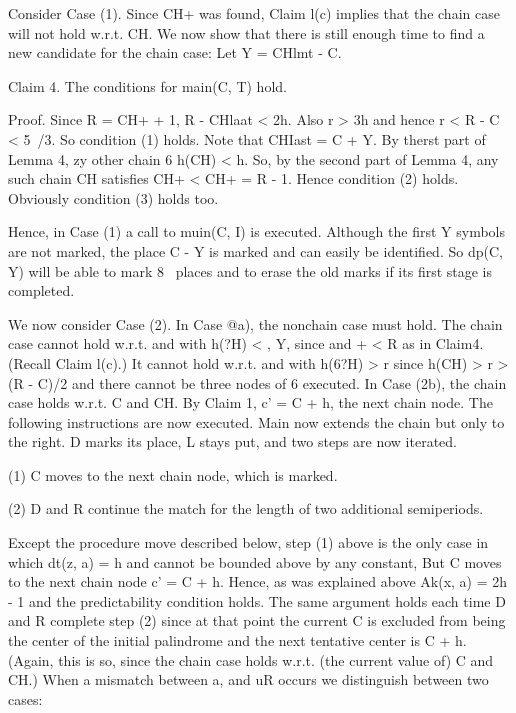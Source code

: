 \documentclass[11pt,a4paper]{report}
\begin{document}
Consider Case (1). Since CH+ was found, Claim l(c) implies that the chain case will
not hold w.r.t. CH. We now show that there is still enough time to find a new candidate
for the chain case: Let Y = CHlmt - C.

Claim 4. The conditions for main(C, T) hold.

Proof. Since R = CH+ + 1, R - CHlaat < 2h. Also r > 3h and hence r < R -
C < 5~/3. So condition (1) holds. Note that CHIast = C + Y. By therst part of Lemma
4, zy other chain 6%
h(CH) < h. So, by the second part of Lemma 4, any such chain CH satisfies CH+ <
CH+ = R - 1. Hence condition (2) holds. Obviously condition (3) holds too. 

Hence, in Case (1) a call to muin(C, I) is executed. Although the first Y symbols are
not marked, the place C - Y is marked and can easily be identified. So dp(C, Y) will be
able to mark 8~ places and to erase the old marks if its first stage is completed.

We now consider Case (2). In Case @a), the nonchain case must hold. The chain case
cannot hold w.r.t.  and with h(?H) < , Y, since  and + < R as in Claim4. (Recall Claim l(c).)
It cannot hold w.r.t.  and  with h(6?H) > r since h(CH) > r > (R - C)/2 and there
cannot be three nodes of 6%
executed. In Case (2b), the chain case holds w.r.t. C and CH. By Claim 1, c’ = C + h,
the next chain node. The following instructions are now executed.
Main now extends the chain but only to the right. D marks its place, L stays put, and
two steps are now iterated.

(1) C moves to the next chain node, which is marked.

(2) D and R continue the match for the length of two additional semiperiods.

Except the procedure move described below, step (1) above is the only case in which
dt(z, a) = h and cannot be bounded above by any constant, But C moves to the next
chain node c’ = C + h. Hence, as was explained above Ak(x, a) = 2h - 1 and the
predictability condition holds. The same argument holds each time D and R complete
step (2) since at that point the current C is excluded from being the center of the initial
palindrome and the next tentative center is C + h. (Again, this is so, since the chain case 
holds w.r.t. (the current value of) C and CH.) When a mismatch between a, and uR
occurs we distinguish between two cases:
\end{document}
